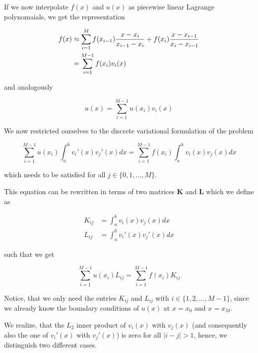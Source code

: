 \documentclass[11pt, a4paper]{article}
\begin{document}
If we now interpolate $f(x)$ and $u(x)$ as piecewise linear Lagrange polynomaials,
we get the representation

\begin{align}
    f(x) &\approx \sum_{i=1}^{M} f(x_{i-1})\frac{x-x_{i}}{x_{i-1} - x_{i}} + f(x_i)\frac{x-x_{i-1}}{x_{i} - x_{i-1}} \notag \\
     &= \sum_{i=1}^{M-1} f(x_i)v_i(x)
\end{align}

and analogously

\begin{equation}
    u(x) = \sum_{i=1}^{M-1} u(x_i)v_i(x)
\end{equation}

We now restricted ourselves to the discrete variational formulation of the problem

\begin{equation}
    \sum_{i=1}^{M-1} u(x_i) \int_a^b v_i'(x) v_j'(x) dx = \sum_{i=1}^{M-1} f(x_i) \int_a^b v_i(x) v_j(x) dx
\end{equation}

which needs to be satisfied for all $j \in \{0, 1, \dots, M\}$.

This equation can be rewritten in terms of two matrices $\mathbf{K}$ and $\mathbf{L}$
which we define as

\begin{align}
    K_{ij} &= \int_a^b v_i(x) v_j(x) dx \\
    L_{ij} &= \int_a^b v_i'(x) v_j'(x) dx
\end{align}

such that we get

\begin{equation}
    \sum_{i=1}^{M-1} u(x_i) L_{ij} = \sum_{i=1}^{M-1} f(x_i) K_{ij}
\end{equation}

Notice, that we only need the entries $K_{ij}$ and $L_{ij}$ with
$i \in \{1, 2, \dots, M-1\}$, since we already know the boundary conditions 
of $u(x)$ at $x = x_0$ and $x = x_M$.

We realize, that the $L_2$ inner product of $v_i(x)$ with $v_j(x)$ (and
consequently also the one of $v_i'(x)$ with $v_j'(x)$) is zero for
all $|i-j| > 1$, hence, we distinguish two different cases.
\end{document}
